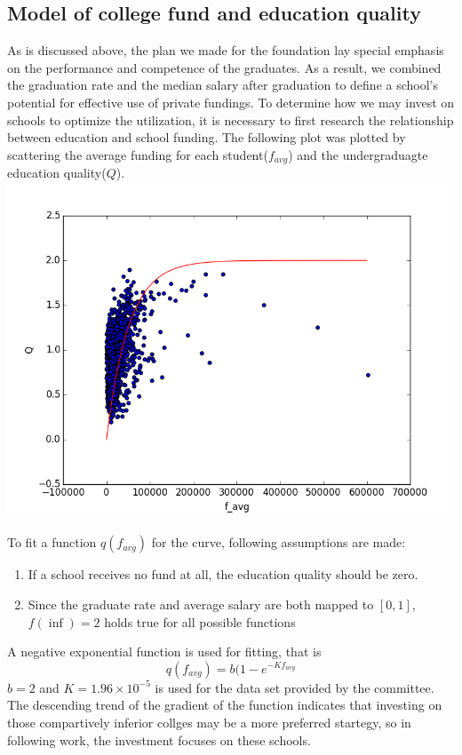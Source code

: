 \subsection{Model of college fund and education quality}
As is discussed above, the plan we made for the foundation lay special emphasis on the performance and competence of the graduates. As a result, we combined the graduation rate and the median salary after graduation to define a school's potential for effective use of private fundings.
To determine how we may invest on schools to optimize the utilization, it is necessary to first research the relationship between education and school funding. The following plot was plotted by scattering the average funding for each student($f_{avg}$) and the undergraduagte education quality($Q$). 
\includegraphics {f_q.png}

To fit a function $q(f_{avg})$ for the curve, following assumptions are made:
\begin{enumerate}
    \item If a school receives no fund at all, the education quality should be zero.
    \item Since the graduate rate and average salary are both mapped to $[0,1]$, $f(\inf)=2$ holds true for all possible functions
\end{enumerate}
A negative exponential function is used for fitting, that is 
$$q(f_{avg}) = b(1-e^{-Kf_{avg}}$$
$b=2$ and $K=1.96\times10^{-5}$ is used for the data set provided by the committee.
The descending trend of the gradient of the function indicates that investing on those compartively inferior collges may be a more preferred startegy, so in following work, the investment focuses on these schools.

